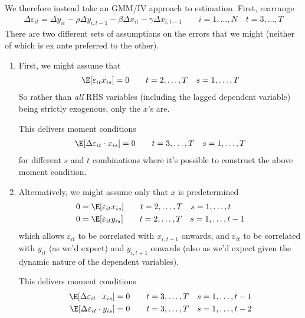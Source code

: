 \documentclass[12pt]{article}
\theoremstyle{plain}
\theoremstyle{definition}
\theoremstyle{remark}
\begin{document}
We therefore instead take an GMM/IV approach to estimation.
First, rearrange
\begin{align}
  \Delta \varepsilon_{it}
  =
  \Delta y_{it}
  - \rho \Delta y_{i,t-1}
  - \beta \Delta x_{it}
  - \gamma \Delta x_{i,t-1}
  \qquad
  i = 1,\ldots,N
  \quad
  t = 3,\ldots,T
  \label{dynamic_diffed_re}
\end{align}
There are two different sets of assumptions on the errors that we might
(neither of which is ex ante preferred to the other).
\begin{enumerate}
  \item First, we might assume that
    \begin{align*}
      \E[\varepsilon_{it}x_{is}] = 0
      \qquad t=2,\ldots,T
      \quad   s=1,\ldots,T
    \end{align*}
    So rather than \emph{all} RHS variables (including the lagged
    dependent variable) being strictly exogenous, only the $x$'s are.

    This delivers moment conditions
    \begin{align*}
      \E[\Delta \varepsilon_{it} \cdot x_{is}]
      = 0
      \qquad  t=3,\ldots,T
      \quad   s=1,\ldots,T
    \end{align*}
    for different $s$ and $t$ combinations where it's possible to
    construct the above moment condition.

  \item
    Alternatively, we might assume only that $x$ is predetermined
    \begin{align*}
      0 &= \E[\varepsilon_{it} x_{is}]
      \qquad t=2,\ldots,T
      \quad  s=1,\ldots,t
      \\
      0 &= \E[\varepsilon_{it} y_{is}]
      \qquad t=2,\ldots,T
      \quad  s=1,\ldots,t-1
    \end{align*}
    which allows $\varepsilon_{it}$ to be correlated with $x_{i,t+1}$
    onwards, and $\varepsilon_{it}$ to be correlated with $y_{it}$ (as
    we'd expect) and $y_{i,t+1}$ onwards (also as we'd expect given the
    dynamic nature of the dependent variables).

    This delivers moment conditions
    \begin{align*}
      \E[\Delta \varepsilon_{it} \cdot x_{is}]
      &= 0
      \qquad  t=3,\ldots,T
      \quad   s=1,\ldots,t-1
      \\
      \E[\Delta \varepsilon_{it} \cdot y_{is}]
      &= 0
      \qquad  t=3,\ldots,T
      \quad   s=1,\ldots,t-2
    \end{align*}
\end{enumerate}
\end{document}

